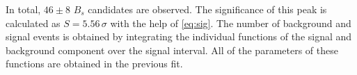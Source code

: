 In total, $46\pm8$ $B_s$ candidates are observed. The significance of this peak is calculated as $S = 5.56 \, \sigma$ with the help of \eqref{eq:sig}.
The number of background and signal events is obtained by integrating the individual functions of the signal and background component over the signal interval.
All of the parameters of these functions are obtained in the previous fit.